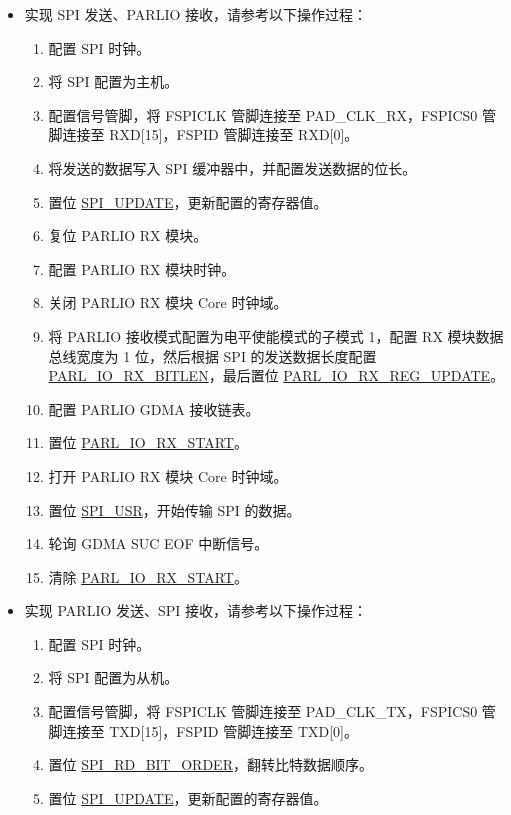 \documentclass[main\_\_CN.tex]{subfiles}
\begin{document}
\begin{itemize}
    \item 实现 SPI 发送、PARLIO 接收，请参考以下操作过程：
    \begin{enumerate}
        \item 配置 SPI 时钟。
        \item 将 SPI 配置为主机。
        \item 配置信号管脚，将 FSPICLK 管脚连接至 PAD\_CLK\_RX，FSPICS0 管脚连接至 RXD[15]，FSPID 管脚连接至 RXD[0]。
        \item 将发送的数据写入 SPI 缓冲器中，并配置发送数据的位长。
        \item 置位 \hyperref[fielddesc:SPIUPDATE]{SPI\_UPDATE}，更新配置的寄存器值。
        \item 复位 PARLIO RX 模块。
        \item 配置 PARLIO RX 模块时钟。
        \item 关闭 PARLIO RX 模块 Core 时钟域。
        \item 将 PARLIO 接收模式配置为电平使能模式的子模式 1，配置 RX 模块数据总线宽度为 1 位，然后根据 SPI 的发送数据长度配置 \hyperref[fielddesc:PARLIORXBITLEN]{PARL\_IO\_RX\_BITLEN}，最后置位 \hyperref[fielddesc:PARLIORXREGUPDATE]{PARL\_IO\_RX\_REG\_UPDATE}。
        \item 配置 PARLIO GDMA 接收链表。
        \item 置位 \hyperref[fielddesc:PARLIORXSTART]{PARL\_IO\_RX\_START}。
        \item 打开 PARLIO RX 模块 Core 时钟域。
        \item 置位 \hyperref[fielddesc:SPIUSR]{SPI\_USR}，开始传输 SPI 的数据。
        \item 轮询 GDMA SUC EOF 中断信号。
        \item 清除 \hyperref[fielddesc:PARLIORXSTART]{PARL\_IO\_RX\_START}。
    \end{enumerate}
    \item 实现 PARLIO 发送、SPI 接收，请参考以下操作过程：
    \begin{enumerate}
        \item 配置 SPI 时钟。
        \item 将 SPI 配置为从机。
        \item 配置信号管脚，将 FSPICLK 管脚连接至 PAD\_CLK\_TX，FSPICS0 管脚连接至 TXD[15]，FSPID 管脚连接至 TXD[0]。
        \item 置位 \hyperref[fielddesc:SPIRDBITORDER]{SPI\_RD\_BIT\_ORDER}，翻转比特数据顺序。
        \item 置位 \hyperref[fielddesc:SPIUPDATE]{SPI\_UPDATE}，更新配置的寄存器值。

\end{enumerate}
\end{itemize}
\end{document}
